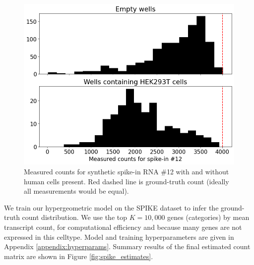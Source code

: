\documentclass{article}
\theoremstyle{plain}
\theoremstyle{definition}
\theoremstyle{remark}
\begin{document}
\begin{figure}[h]
    \centering
    \includegraphics[width=0.85\columnwidth]{measured_sp12_counts.png}
    \caption{Measured counts for synthetic spike-in RNA \#12 with and without human cells present. Red dashed line is ground-truth count (ideally all measurements would be equal).}
    \label{fig:measured_sp12}
\end{figure}

We train our hypergeometric model on the SPIKE dataset to infer the ground-truth count distribution. We use the top $K=10,000$ genes (categories) by mean transcript count, for computational efficiency and because many genes are not expressed in this celltype. Model and training hyperparameters are given in Appendix \ref{appendix:hyperparams}. Summary results of the final estimated count matrix are shown in Figure \ref{fig:spike_estimates}.
\end{document}
